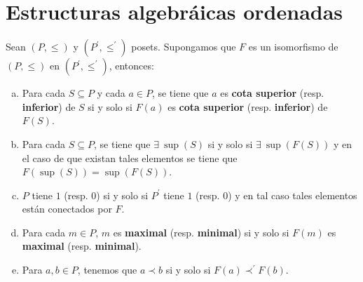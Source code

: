 \section{Estructuras algebráicas ordenadas}

  \begin{lemma} \label{lemma_1}
    \PN Sean $(P, \leq)$ y $(P^{\prime}, \leq^{\prime})$ posets. Supongamos que $F$ es un isomorfismo de $(P, \leq)$ en
    $(P^{\prime}, \leq^{\prime})$, entonces:

    \begin{enumerate}[a)]
      \item Para cada $S \subseteq P$ y cada $a \in P$, se tiene que $a$ es \textbf{cota superior} (resp.
        \textbf{inferior}) de $S$ si y solo si $F(a)$ es \textbf{cota superior} (resp. \textbf{inferior}) de $F(S)$.
      \item Para cada $S \subseteq P$, se tiene que $\exists \ \sup (S)$ si y solo si $\exists \ \sup (F(S))$ y en el
        caso de que existan tales elementos se tiene que $F(\sup (S)) = \sup (F(S))$.
      \item $P$ tiene $1$ (resp. $0$) si y solo si $P^{\prime}$ tiene $1$ (resp. $0$) y en tal caso tales elementos
        están conectados por $F$.
      \item Para cada $m \in P$, $m$ es \textbf{maximal} (resp. \textbf{minimal}) si y solo si $F(m)$ es
        \textbf{maximal} (resp. \textbf{minimal}).
      \item Para $a, b \in P$, tenemos que $a \prec b$ si y solo si $F(a) \prec^{\prime} F(b)$.
    \end{enumerate}
  \end{lemma}
